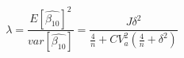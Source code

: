 \begin{equation}
\label{eq:lambda}
\lambda = \frac{E[\hat{\beta_{10}}]^2}{{var}[\hat{\beta_{10}}]} = \frac{J\delta^2}{\frac{4}{n}+CV_{a}^2(\frac{4}{n} + \delta^2)}
\end{equation}